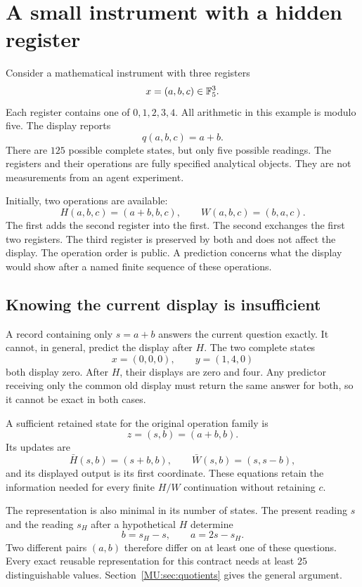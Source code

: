 \section{A small instrument with a hidden register}\label{MU:sec:instrument}
Consider a mathematical instrument with three registers
\[
x=(a,b,c)\in\mathbb F_5^3.
\]
Each register contains one of $0,1,2,3,4$. All arithmetic in this example is modulo five. The display reports
\[
q(a,b,c)=a+b.
\]
There are $125$ possible complete states, but only five possible readings. The registers and their operations are fully specified analytical objects. They are not measurements from an agent experiment.

Initially, two operations are available:
\begin{equation}\label{MU:eq:instrument-ops}
H(a,b,c)=(a+b,b,c),\qquad W(a,b,c)=(b,a,c).
\end{equation}
The first adds the second register into the first. The second exchanges the first two registers. The third register is preserved by both and does not affect the display. The operation order is public. A prediction concerns what the display would show after a named finite sequence of these operations.

\subsection{Knowing the current display is insufficient}
A record containing only $s=a+b$ answers the current question exactly. It cannot, in general, predict the display after $H$. The two complete states
\[
x=(0,0,0),\qquad y=(1,4,0)
\]
both display zero. After $H$, their displays are zero and four. Any predictor receiving only the common old display must return the same answer for both, so it cannot be exact in both cases.

A sufficient retained state for the original operation family is
\[
z=(s,b)=(a+b,b).
\]
Its updates are
\begin{equation}\label{MU:eq:display-coordinates}
\bar H(s,b)=(s+b,b),\qquad \bar W(s,b)=(s,s-b),
\end{equation}
and its displayed output is its first coordinate. These equations retain the information needed for every finite $H/W$ continuation without retaining $c$.

The representation is also minimal in its number of states. The present reading $s$ and the reading $s_H$ after a hypothetical $H$ determine
\[
b=s_H-s,\qquad a=2s-s_H.
\]
Two different pairs $(a,b)$ therefore differ on at least one of these questions. Every exact reusable representation for this contract needs at least $25$ distinguishable values. Section~\ref{MU:sec:quotients} gives the general argument.

